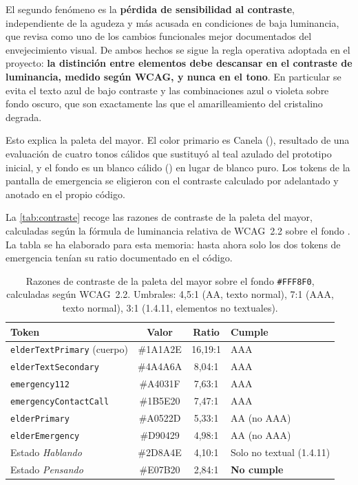 El segundo fenómeno es la \textbf{pérdida de sensibilidad al contraste}, independiente de la agudeza y
más acusada en condiciones de baja luminancia, que \textcite{Owsley2011} revisa como uno de los cambios
funcionales mejor documentados del envejecimiento visual. De ambos hechos se sigue la regla operativa
adoptada en el proyecto: \textbf{la distinción entre elementos debe descansar en el contraste de
luminancia, medido según WCAG, y nunca en el tono}. En particular se evita el texto azul de bajo contraste
y las combinaciones azul o violeta sobre fondo oscuro, que son exactamente las que el amarilleamiento del
cristalino degrada.

Esto explica la paleta del mayor. El color primario es Canela (), resultado de una
evaluación de cuatro tonos cálidos que sustituyó al teal azulado del prototipo inicial, y el fondo es un
blanco cálido () en lugar de blanco puro. Los tokens de la pantalla de emergencia se
eligieron con el contraste calculado por adelantado y anotado en el propio código.

La \autoref{tab:contraste} recoge las razones de contraste de la paleta del mayor, calculadas según la
fórmula de luminancia relativa de WCAG~2.2 \autocite{wcag} sobre el fondo . La tabla se ha
elaborado para esta memoria: hasta ahora solo los dos tokens de emergencia tenían su ratio documentado en
el código.

\begin{table}[htbp]
    \centering
    \begin{tabularx}{\textwidth}{@{}>{\RaggedRight\arraybackslash}X c c >{\RaggedRight\arraybackslash}X@{}}
        \toprule
        \textbf{Token} & \textbf{Valor} & \textbf{Ratio} & \textbf{Cumple} \\
        \midrule
        \texttt{elderTextPrimary} (cuerpo)     & \#1A1A2E & 16{,}19:1 & AAA \\
        \texttt{elderTextSecondary}            & \#4A4A6A & 8{,}04:1  & AAA \\
        \texttt{emergency112}                  & \#A4031F & 7{,}63:1  & AAA \\
        \texttt{emergencyContactCall}          & \#1B5E20 & 7{,}47:1  & AAA \\
        \texttt{elderPrimary}                  & \#A0522D & 5{,}33:1  & AA (no AAA) \\
        \texttt{elderEmergency}                & \#D90429 & 4{,}98:1  & AA (no AAA) \\
        Estado \emph{Hablando}                 & \#2D8A4E & 4{,}10:1  & Solo no textual (1.4.11) \\
        Estado \emph{Pensando}                 & \#E07B20 & 2{,}84:1  & \textbf{No cumple} \\
        \bottomrule
    \end{tabularx}
    \caption{Razones de contraste de la paleta del mayor sobre el fondo \texttt{\#FFF8F0}, calculadas
    según WCAG~2.2. Umbrales: 4{,}5:1 (AA, texto normal), 7:1 (AAA, texto normal), 3:1 (1.4.11, elementos
    no textuales).}
    \label{tab:contraste}
\end{table}

